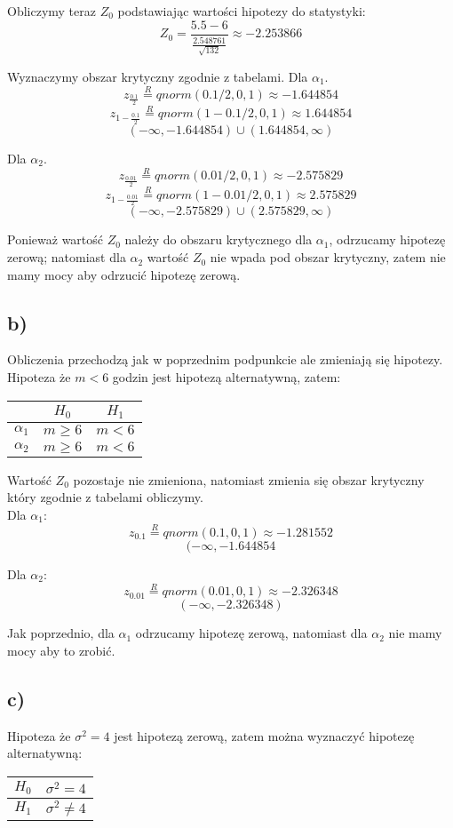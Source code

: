 \documentclass{article}
\begin{document}
Obliczymy teraz $Z_0$ podstawiając wartości hipotezy do statystyki:
\[ Z_0 = \frac{5.5 - 6}{\frac{2.548761}{\sqrt{132}}} \approx -2.253866 \]

Wyznaczymy obszar krytyczny zgodnie z tabelami. Dla $\alpha_1$.
\[ z_{\frac{0.1}{2}} \overset{R}{=} qnorm(0.1/2, 0, 1) \approx -1.644854 \]
\[ z_{1 - \frac{0.1}{2}} \overset{R}{=} qnorm(1 - 0.1/2, 0, 1) \approx 1.644854 \]
\[ (-\infty, -1.644854) \cup (1.644854, \infty) \]

Dla $\alpha_2$.
\[ z_{\frac{0.01}{2}} \overset{R}{=} qnorm(0.01/2, 0, 1) \approx -2.575829 \]
\[ z_{1 - \frac{0.01}{2}} \overset{R}{=} qnorm(1 - 0.01/2, 0, 1) \approx 2.575829 \]
\[ (-\infty, -2.575829) \cup (2.575829, \infty) \]

Ponieważ wartość $Z_0$ należy do obszaru krytycznego dla $\alpha_1$, odrzucamy hipotezę zerową; natomiast dla $\alpha_2$ wartość $Z_0$ nie wpada pod obszar krytyczny, zatem nie mamy mocy aby odrzucić hipotezę zerową. 

\subsection{b)}
Obliczenia przechodzą jak w poprzednim podpunkcie ale zmieniają się hipotezy. Hipoteza że $m<6$ godzin jest hipotezą alternatywną, zatem:
\begin{center} \begin{tabular}{|c|c|c|} \hline
 & $H_0$ & $H_1$ \\ \hline
$\alpha_1$ & $m \geq 6$ & $m < 6$ \\ \hline
$\alpha_2$ & $m \geq 6$ & $m < 6$ \\ \hline
\end{tabular} \end{center}

Wartość $Z_0$ pozostaje nie zmieniona, natomiast zmienia się obszar krytyczny który zgodnie z tabelami obliczymy. \\
Dla $\alpha_1$:
\[ z_{0.1} \overset{R}{=} qnorm(0.1, 0, 1) \approx -1.281552 \]
\[ (-\infty, -1.644854 \]

Dla $\alpha_2$:
\[ z_{0.01} \overset{R}{=} qnorm(0.01, 0, 1) \approx -2.326348 \]
\[ (-\infty, -2.326348) \]

Jak poprzednio, dla $\alpha_1$ odrzucamy hipotezę zerową, natomiast dla $\alpha_2$ nie mamy mocy aby to zrobić.

\subsection{c)}
Hipoteza że $\sigma^2 = 4$ jest hipotezą zerową, zatem można wyznaczyć hipotezę alternatywną:
\begin{center} \begin{tabular}{|c|c|} \hline
$H_0$ & $\sigma^2 = 4$ \\ \hline
$H_1$ & $\sigma^2 \neq 4$ \\ \hline
\end{tabular} \end{center}
\end{document}
